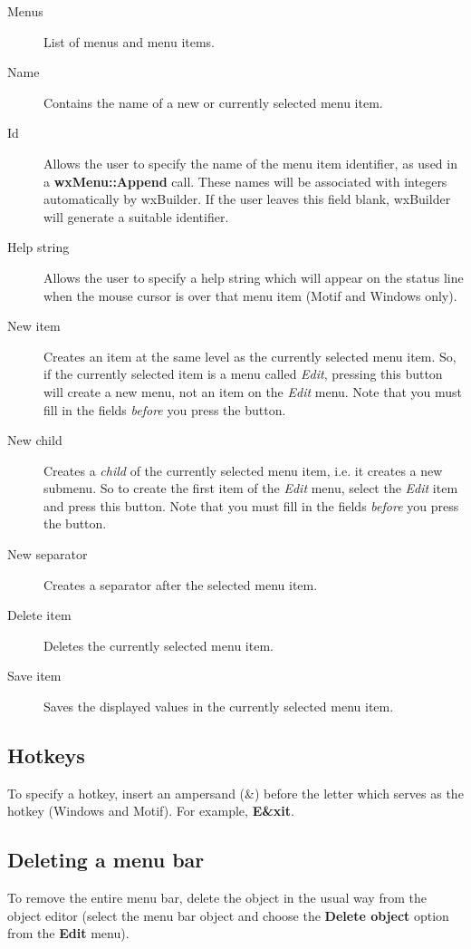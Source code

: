 \begin{description}
\item[Menus] List of menus and menu items.
\item[Name] Contains the name of a new or currently
selected menu item.
\item[Id] Allows the user to specify the name of the
menu item identifier, as used in a {\bf wxMenu::Append} call.
These names will be associated with integers automatically
by wxBuilder. If the user leaves this field blank, wxBuilder
will generate a suitable identifier.
\item[Help string] Allows the user to specify a
help string which will appear on the status line when
the mouse cursor is over that menu item (Motif and Windows only).
\item[New item] Creates an item at the same level as the
currently selected menu item. So, if the currently
selected item is a menu called {\it Edit}, pressing this
button will create a new menu, not an item on the {\it Edit}\rtfsp
menu. Note that you must fill in the fields {\it before} you
press the button.
\item[New child] Creates a {\it child} of the currently selected menu
item, i.e. it creates a new submenu. So to create the first item
of the {\it Edit} menu, select the {\it Edit} item and press
this button.  Note that you must fill in the fields {\it before} you
press the button.
\item[New separator] Creates a separator after the selected menu item.
\item[Delete item] Deletes the currently selected menu item.
\item[Save item] Saves the displayed values in the currently selected
menu item.
\end{description}
\par

\subsection{Hotkeys}

To specify a hotkey, insert an ampersand (\&) before the letter
which serves as the hotkey (Windows and Motif). For example,\rtfsp
{\bf E\&xit}.

\subsection{Deleting a menu bar}

To remove the entire menu bar, delete the object in the usual
way from the object editor (select the menu bar object and choose
the {\bf Delete object} option from the {\bf Edit} menu).

